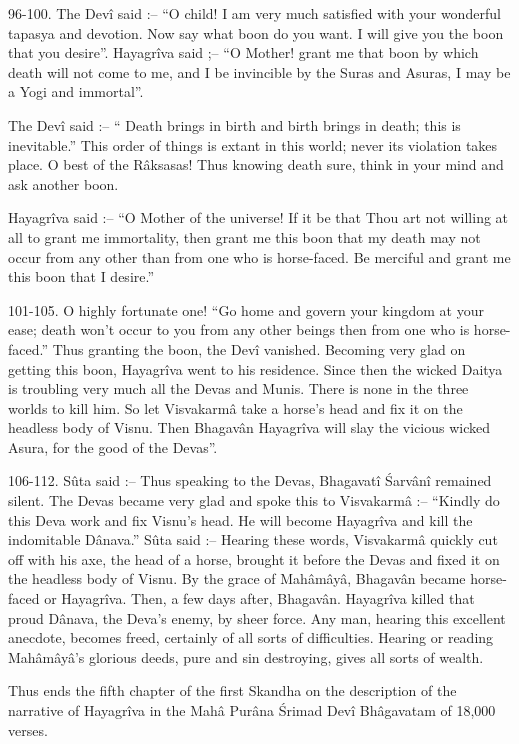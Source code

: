 96-100. The Dev\^i said :-- ``O child! I am very much satisfied with your wonderful tapasya and devotion. Now say what boon do you want. I will give you the boon that you desire''. Hayagr\^iva said ;-- ``O Mother! grant me that boon by which death will not come to me, and I be invincible by the Suras and Asuras, I may be a Yogi and immortal''.

The Dev\^i said :-- `` Death brings in birth and birth brings in death; this is inevitable.'' This order of things is extant in this world; never its violation takes place. O best of the R\^aksasas! Thus knowing death sure, think in your mind and ask another boon.

Hayagr\^iva said :-- ``O Mother of the universe! If it be that Thou art not willing at all to grant me immortality, then grant me this boon that my death may not occur from any other than from one who is horse-faced. Be merciful and grant me this boon that I desire.''

101-105. O highly fortunate one! ``Go home and govern your kingdom at your ease; death won't occur to you from any other beings then from one who is horse-faced.'' Thus granting the boon, the Dev\^i vanished. Becoming very glad on getting this boon, Hayagr\^iva went to his residence. Since then the wicked Daitya is troubling very much all the Devas and Munis. There is none in the three worlds to kill him. So let Visvakarm\^a take a horse's head and fix it on the headless body of Visnu. Then Bhagav\^an Hayagr\^iva will slay the vicious wicked Asura, for the good of the Devas''.

106-112. S\^uta said :-- Thus speaking to the Devas, Bhagavat\^i \'Sarv\^an\^i remained silent. The Devas became very glad and spoke this to Visvakarm\^a :--  ``Kindly do this Deva work and fix Visnu's head. He will become Hayagr\^iva and kill the indomitable D\^anava.'' S\^uta said :-- Hearing these words, Visvakarm\^a quickly cut off with his axe, the head of a horse, brought it before the Devas and fixed it on the headless body of Visnu. By the grace of Mah\^am\^ay\^a, Bhagav\^an became horse-faced or Hayagr\^iva. Then, a few days after, Bhagav\^an. Hayagr\^iva killed that proud D\^anava, the Deva's enemy, by sheer force. Any man, hearing this excellent anecdote, becomes freed, certainly of all sorts of difficulties. Hearing or reading Mah\^am\^ay\^a's glorious deeds, pure and sin destroying, gives all sorts of wealth.

Thus ends the fifth chapter of the first Skandha on the description of the narrative of Hayagr\^iva in the Mah\^a Pur\^ana \'Srimad Dev\^i Bh\^agavatam of 18,000 verses.